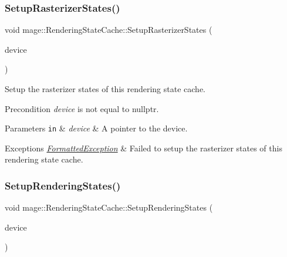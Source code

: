 \subsubsection{\texorpdfstring{Setup\+Rasterizer\+States()}{SetupRasterizerStates()}}
{\footnotesize\ttfamily void mage\+::\+Rendering\+State\+Cache\+::\+Setup\+Rasterizer\+States (\begin{DoxyParamCaption}\item[{I\+D3\+D11\+Device2 $\ast$}]{device }\end{DoxyParamCaption})\hspace{0.3cm}{\ttfamily [private]}}

Setup the rasterizer states of this rendering state cache.

\begin{DoxyPrecond}{Precondition}
{\itshape device} is not equal to {\ttfamily nullptr}. 
\end{DoxyPrecond}

\begin{DoxyParams}[1]{Parameters}
\mbox{\tt in}  & {\em device} & A pointer to the device. \\
\hline
\end{DoxyParams}

\begin{DoxyExceptions}{Exceptions}
{\em \hyperlink{structmage_1_1_formatted_exception}{Formatted\+Exception}} & Failed to setup the rasterizer states of this rendering state cache. \\
\hline
\end{DoxyExceptions}
\hypertarget{structmage_1_1_rendering_state_cache_a5f1d08b50508baddaa365395d8f6d409}{}\label{structmage_1_1_rendering_state_cache_a5f1d08b50508baddaa365395d8f6d409} 
\subsubsection{\texorpdfstring{Setup\+Rendering\+States()}{SetupRenderingStates()}}
{\footnotesize\ttfamily void mage\+::\+Rendering\+State\+Cache\+::\+Setup\+Rendering\+States (\begin{DoxyParamCaption}\item[{I\+D3\+D11\+Device2 $\ast$}]{device }\end{DoxyParamCaption})\hspace{0.3cm}{\ttfamily [private]}}

